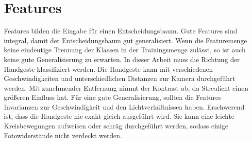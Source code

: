 \section{Features}
Features bilden die Eingabe für einen Entscheidungsbaum. Gute Features sind integral, damit der Entscheidungsbaum gut generalisiert. Wenn die Featuremenge keine eindeutige Trennung der Klassen in der
Trainingsmenge zulässt, so ist auch keine gute Generalisierung zu erwarten.
\newline
\newline
In dieser Arbeit muss die Richtung der Handgeste klassifiziert werden. Die Handgeste kann mit verschiedenen Geschwindigkeiten und unterschiedlichen Distanzen zur Kamera durchgeführt werden. Mit
zunehmender Entfernung nimmt der Kontrast ab, da Streulicht einen größeren Einfluss hat. Für eine gute Generalisierung, sollten die Features Invarianzen zur Geschwindigkeit und den
Lichtverhältnissen haben. Erschwerend ist, dass die Handgeste nie exakt gleich ausgeführt wird. Sie kann eine leichte Kreisbewegungen aufweisen oder schräg durchgeführt werden, sodass einige
Fotowiderstände nicht verdeckt werden.

